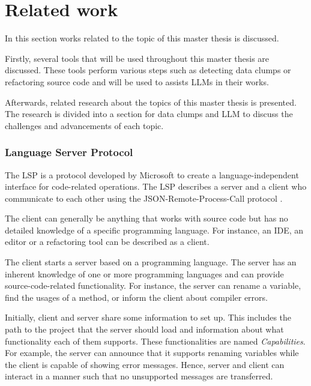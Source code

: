 \section{Related work}\label{sec:related_research}
In this section works related to the topic of this master thesis is discussed. 

Firstly,  several tools that will be used throughout this master thesis are discussed. These tools perform various steps such as detecting data clumps or  refactoring source code and will be used to assists \acp{LLM} in their works.

Afterwards, related research about the topics of this master thesis is presented. The research is divided into a section for data clumps and \ac{LLM} to discuss the challenges and advancements of each topic. 


\subsubsection{Language Server Protocol} \label{sec:lsp}
The \ac{LSP}  \cite{lsp_website} is a protocol developed by Microsoft to create a language-independent interface for code-related operations. 
The \ac{LSP}  describes a server and a client who communicate to each other using the JSON-Remote-Process-Call protocol \cite{json_rpc}. 

The client can generally be anything that works with source code but has no detailed knowledge of a specific programming language. For instance, an \ac{IDE}, an editor or a refactoring tool can be described as a client.

The client starts a server based on a programming language. The server has an inherent knowledge of one or more programming languages and can provide source-code-related functionality. For instance, the server can rename a variable, find the usages of a method, or inform the client about compiler errors. 

Initially, client and server share some information to set up. This includes the path to the project that the server should load and information about what functionality each of them supports. These functionalities are named \textit{Capabilities}. For example, the server can announce that it supports renaming variables while the client is capable of showing error messages. Hence, server and client can interact in a manner such that no unsupported messages are transferred.

